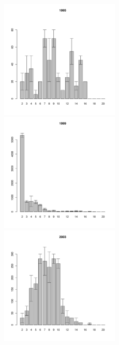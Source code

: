 \begin{figure}[hp]
\begin{minipage}[b]{.3\linewidth}
\begin{center}
	\end{center}
	\end{minipage}
	\begin{minipage}[b]{.3\linewidth}
	\begin{center}
	\includegraphics[width=60mm]{../White_Sea/Ryashkov_ZRS/zrs2_1995_.pdf}
	\end{center}
	\end{minipage}
	\hfil %
	\begin{minipage}[b]{.3\linewidth}
	\begin{center}
	\includegraphics[width=60mm]{../White_Sea/Ryashkov_ZRS/zrs2_1999_.pdf}
	\end{center}
	\end{minipage}
	\hfil %
	\begin{minipage}[b]{.3\linewidth}
	\begin{center}
	\includegraphics[width=60mm]{../White_Sea/Ryashkov_ZRS/zrs2_2003_.pdf}
	\end{center}
	\end{minipage}



\end{figure}
